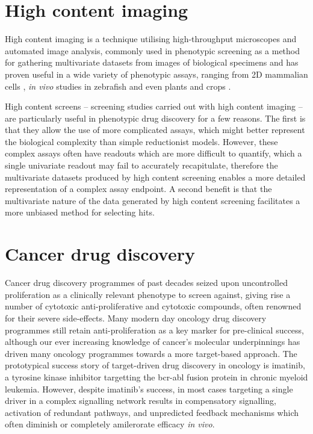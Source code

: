 \documentclass[a4paper,11pt,twoside,openright]{scrbook}
\begin{document}

\section{High content imaging}
High content imaging is a technique utilising high-throughput microscopes and automated image analysis, commonly used in phenotypic screening as a method for gathering multivariate datasets from images of biological specimens and has proven useful in a wide variety of phenotypic assays, ranging from 2D mammalian cells \cite{cite_HCA_cell_papers}, \textit{in vivo} studies in zebrafish \cite{GeoffreyBurns2005} and even plants and crops \cite{Chen2014}.

High content screens -- screening studies carried out with high content imaging -- are particularly useful in phenotypic drug discovery for a few reasons.
The first is that they allow the use of more complicated assays, which might better represent the biological complexity than simple reductionist models.
However, these complex assays often have readouts which are more difficult to quantify, which a single univariate readout may fail to accurately recapitulate,
therefore the multivariate datasets produced by high content screening enables a more detailed representation of a complex assay endpoint.
A second benefit is that the multivariate nature of the data generated by high content screening facilitates a more unbiased method for selecting hits.



\section{Cancer drug discovery}
Cancer drug discovery programmes of past decades seized upon uncontrolled proliferation as a clinically relevant phenotype to screen against, giving rise a number of cytotoxic anti-proliferative and cytotoxic compounds, often renowned for their severe side-effects.
Many modern day oncology drug discovery programmes still retain anti-proliferation as a key marker for pre-clinical success, although our ever increasing knowledge of cancer's molecular underpinnings has driven many oncology programmes towards a more target-based approach.
The prototypical success story of target-driven drug discovery in oncology is imatinib, a tyrosine kinase inhibitor targetting the bcr-abl fusion protein in chronic myeloid leukemia.
However, despite imatinib's success, in most cases targeting a single driver in a complex signalling network results in compensatory signalling, activation of redundant pathways, and unpredicted feedback mechanisms which often diminish or completely amilerorate efficacy \textit{in vivo}.
\end{document}
